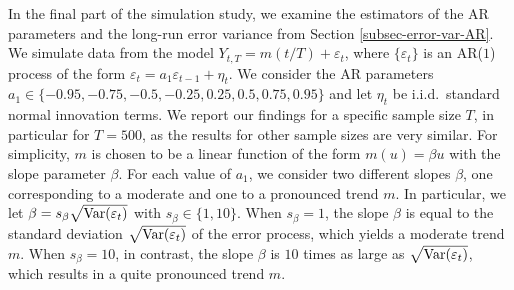 In the final part of the simulation study, we examine the estimators of the AR para\-meters and the long-run error variance from Section \ref{subsec-error-var-AR}. We simulate data from the model $Y_{t,T} = m(t/T) + \varepsilon_t$, where $\{ \varepsilon_t\}$ is an AR($1$) process of the form $\varepsilon_t = a_1 \varepsilon_{t-1} + \eta_t$. We consider the AR parameters $a_1 \in \{-0.95,-0.75,-0.5,-0.25,0.25,0.5,0.75,0.95\}$ and let $\eta_t$ be i.i.d.\ standard normal innovation terms. We report our findings for a specific sample size $T$, in particular for $T=500$, as the results for other sample sizes are very similar. For simplicity, $m$ is chosen to be a linear function of the form $m(u) = \beta u$ with the slope parameter $\beta$. For each value of $a_1$, we consider two different slopes $\beta$, one corresponding to a moderate and one to a pronounced trend $m$. 
In particular, we let $\beta = s_\beta \sqrt{\textnormal{Var}(\varepsilon_t)}$ with $s_\beta \in \{1,10\}$. When $s_\beta = 1$, the slope $\beta$ is equal to the standard deviation $\sqrt{\textnormal{Var}(\varepsilon_t)}$ of the error process, which yields a moderate trend $m$. When $s_\beta = 10$, in contrast, the slope $\beta$ is $10$ times as large as $\sqrt{\textnormal{Var}(\varepsilon_t)}$, which results in a quite pronounced trend $m$. 


